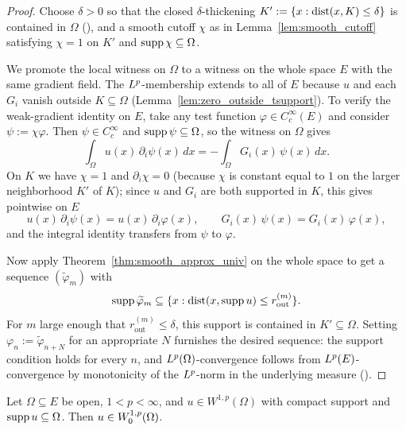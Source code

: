 \begin{proof}
\leanok
{}

Choose $\delta > 0$ so that the closed $\delta$-thickening $K' := \{x :
\operatorname{dist}(x,K) \le \delta\}$ is contained in $\Omega$
(), and a smooth cutoff
$\chi$ as in Lemma~\ref{lem:smooth_cutoff} satisfying $\chi = 1$ on $K'$ and
$\operatorname{supp} \chi \subseteq \Omega$.

We promote the local witness on $\Omega$ to a witness on the whole space $E$
with the same gradient field. The $L^{p}$-membership extends to all of $E$
because $u$ and each $G_i$ vanish outside $K \subseteq \Omega$
(Lemma~\ref{lem:zero_outside_tsupport}). To verify the weak-gradient identity
on $E$, take any test function $\varphi \in C_c^\infty(E)$ and consider $\psi
:= \chi \varphi$. Then $\psi \in C_c^\infty$ and $\operatorname{supp} \psi \subseteq \Omega$,
so the witness on $\Omega$ gives
\begin{equation*}
  \int_\Omega u(x)\,\partial_i\psi(x)\,dx = -\int_\Omega G_i(x)\,\psi(x)\,dx.
\end{equation*}
On $K$ we have $\chi = 1$ and $\partial_i\chi = 0$ (because $\chi$ is constant
equal to $1$ on the larger neighborhood $K'$ of $K$); since $u$ and $G_i$ are
both supported in $K$, this gives pointwise on $E$
\begin{equation*}
  u(x)\,\partial_i\psi(x) = u(x)\,\partial_i\varphi(x), \qquad
  G_i(x)\,\psi(x) = G_i(x)\,\varphi(x),
\end{equation*}
and the integral identity transfers from $\psi$ to $\varphi$.

Now apply Theorem~\ref{thm:smooth_approx_univ} on the whole space to get a
sequence $(\widetilde\varphi_m)$ with
\begin{equation*}
  \operatorname{supp} \widetilde\varphi_m \subseteq \{x : \operatorname{dist}(x, \operatorname{supp} u) \le r_{\text{out}}^{(m)}\}.
\end{equation*}
For $m$ large enough that $r_{\text{out}}^{(m)} \le \delta$, this support is
contained in $K' \subseteq \Omega$. Setting $\varphi_n :=
\widetilde\varphi_{n+N}$ for an appropriate $N$ furnishes the desired sequence:
the support condition holds for every $n$, and $L^{p}(\Omega)$-convergence
follows from $L^{p}(E)$-convergence by monotonicity of the $L^{p}$-norm in
the underlying measure ().
\end{proof}

\begin{theorem}
\label{thm:memW01p_of_compactly_supported}
\leanok
{}
Let $\Omega \subseteq E$ be open, $1 < p < \infty$, and $u \in W^{1,p}(\Omega)$
with compact support and $\operatorname{supp} u \subseteq \Omega$. Then $u \in W_0^{1,p}(\Omega)$.
\end{theorem}

